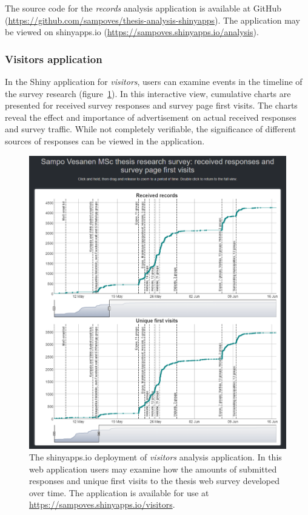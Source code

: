 The source code for the \textit{records} analysis application is available at GitHub (\textcolor{blue}{\url{https://github.com/sampoves/thesis-analysis-shinyapps}}). The application may be viewed on shinyapps.io (\textcolor{blue}{\url{https://sampoves.shinyapps.io/analysis}}).

\subsubsection{Visitors application}

In the Shiny application for \textit{visitors}, users can examine events in the timeline of the survey research (figure~\ref{fig:shinyapps_visitors}). In this interactive view, cumulative charts are presented for received survey responses and survey page first visits. The charts reveal the effect and importance of advertisement on actual received responses and survey traffic. While not completely verifiable, the significance of different sources of responses can be viewed in the application.

\begin{figure}[H]%
    \centering
    \includegraphics[width=.8\textwidth]{images/shinyapps_visitors.png}
    \caption[Visitors analysis application screen capture]{The shinyapps.io deployment of \textit{visitors} analysis application. In this web application users may examine how the amounts of submitted responses and unique first visits to the thesis web survey developed over time. The application is available for use at \textcolor{blue}{\url{https://sampoves.shinyapps.io/visitors}}.}%
    \label{fig:shinyapps_visitors}%
\end{figure}

